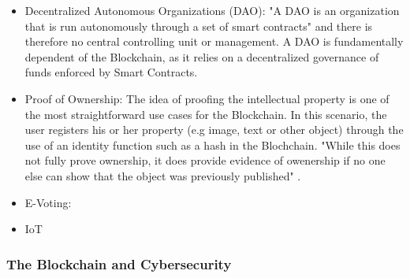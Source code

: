 \begin{itemize}
  \item Decentralized Autonomous Organizations (DAO): "A DAO is an organization that is run autonomously through a set of smart contracts" \cite{Wust2017} and there is therefore no central controlling unit or management. A DAO is fundamentally dependent of the Blockchain, as it relies on a decentralized governance of funds enforced by Smart Contracts.
  \item Proof of Ownership: The idea of proofing the intellectual property is one of the most straightforward use cases for the Blockchain. In this scenario, the user registers his or her property (e.g image, text or other object) through the use of an identity function such as a hash in the Blochchain. "While this does not fully prove ownership, it does provide evidence of owenership if no one else can show that the object was previously published" \cite{Wust2017}.
  \item E-Voting: 
  \item IoT
\end{itemize}
\subsubsection{The Blockchain and Cybersecurity}

